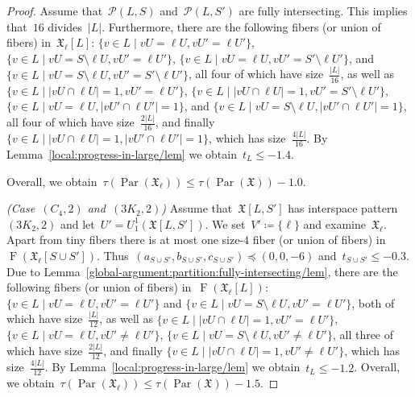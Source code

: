 \documentclass[english,a4paper]{article}
\theoremstyle{plain}
\theoremstyle{definition}
\newcommand{\abs}[1]{| #1 |}
\DeclareMathOperator{\Fibers}{F}
\newcommand{\coherentConfig}{\ensuremath{\mathfrak{X}}}
\newcommand{\fibers}[1]{\ensuremath{\Fibers \left( #1 \right)}}
\newcommand{\interspace}[2]{\ensuremath{\coherentConfig[#1,#2]}}
\newcommand{\equivalenceClasses}[1]{\ensuremath{\mathcal{P}(#1)}}
\DeclareMathOperator{\parameters}{Par}
\newcommand{\ipfourCycle}   {\ensuremath{(\cycle{4},2)}}
\newcommand{\ipsixMatching}             {\ensuremath{(\disjointCliques{3}{2},2)}}
\newcommand{\clique}[1]{\ensuremath{K_{#1}}}
\newcommand{\cycle}[1]{\ensuremath{C_{#1}}}
\newcommand{\disjointCliques}[2]{\ensuremath{#1 \clique{#2}}}
\begin{document}
\begin{proof}
    Assume that~$\equivalenceClasses{L,S}$ and~$\equivalenceClasses{L, S'}$ are fully intersecting.
    This implies that~$16$ divides~$|L|$.
    Furthermore, there are the following fibers (or union of fibers) in~$\coherentConfig_\ell[L]$:
    $\{ v \in L \mid vU =               \ell U,  vU' =              \ell U' \}$,
    $\{ v \in L \mid vU = S \setminus   \ell U,  vU' =              \ell U' \}$,
    $\{ v \in L \mid vU =               \ell U,  vU' = S' \setminus \ell U' \}$, and
    $\{ v \in L \mid vU = S \setminus   \ell U,  vU' = S' \setminus \ell U' \}$, all four of which have size~$\frac{\abs{L}}{16}$, as well as
    $\{ v \in L \mid \abs{vU \cap \ell U} = 1 ,  vU' =              \ell U' \}$,
    $\{ v \in L \mid \abs{vU \cap \ell U} = 1 ,  vU' = S' \setminus \ell U' \}$,
    $\{ v \in L \mid vU =               \ell U,  \abs{vU' \cap \ell U'} = 1 \}$, and
    $\{ v \in L \mid vU = S \setminus   \ell U,  \abs{vU' \cap \ell U'} = 1 \}$, all four of which have size~$\frac{2\abs{L}}{16}$, and finally
    $\{ v \in L \mid \abs{vU \cap \ell U} = 1 ,  \abs{vU' \cap \ell U'} = 1 \}$, which has size~$\frac{4\abs{L}}{16}$.
    By Lemma~\ref{local:progress-in-large/lem} we obtain~$t_L \leq -1.4$.

    Overall, we obtain~$\tau(\parameters(\coherentConfig_\ell)) \leq \tau(\parameters(\coherentConfig))- 1.0$.


    \textit{(Case~$\ipfourCycle$ and~$\ipsixMatching$)}
    Assume that~$\interspace{L}{S'}$ has interspace pattern~$\ipsixMatching$ and let~$U' = U^1_1(\interspace{L}{S'})$.
    We set~$V' \coloneqq \{\ell\}$ and examine~$\coherentConfig_\ell$.
    Apart from tiny fibers there is at most one size-$4$ fiber (or union of fibers) in~$\fibers{\coherentConfig_\ell[S \cup S']}$.
    Thus~$(a_{S \cup S'},b_{S \cup S'}, c_{S \cup S'}) \preceq (0,0,-6)$ and~$t_{S \cup S'} \leq - 0.3$.
    Due to Lemma~\ref{global-argument:partition:fully-intersecting/lem}, there are the following fibers (or union of fibers) in~$\fibers{\coherentConfig_\ell[L]}$:
    $\{ v \in L \mid vU =               \ell U,  vU' =    \ell U' \}$ and
    $\{ v \in L \mid vU = S \setminus   \ell U,  vU' =    \ell U' \}$, both of which have size~$\frac{\abs{L}}{12}$, as well as
    $\{ v \in L \mid \abs{vU \cap \ell U} = 1 ,  vU' =    \ell U' \}$,
    $\{ v \in L \mid vU =               \ell U,  vU' \neq \ell U' \}$,
    $\{ v \in L \mid vU = S \setminus   \ell U,  vU' \neq \ell U' \}$, all three of which have size~$\frac{2\abs{L}}{12}$, and finally
    $\{ v \in L \mid \abs{vU \cap \ell U} = 1 ,  vU' \neq \ell U' \}$, which has size~$\frac{4\abs{L}}{12}$.
    By Lemma~\ref{local:progress-in-large/lem} we obtain~$t_L \leq -1.2$.
    Overall, we obtain~$\tau(\parameters(\coherentConfig_\ell)) \leq \tau(\parameters(\coherentConfig))- 1.5$.




\end{proof}
\end{document}

